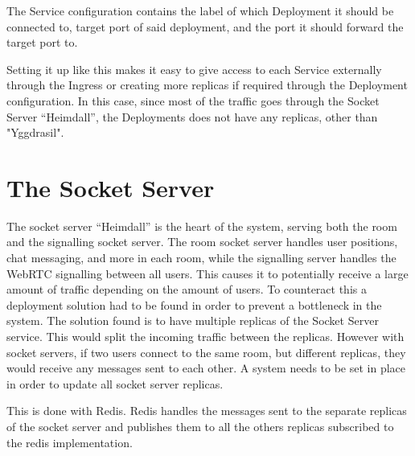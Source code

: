 The Service configuration contains the label of which Deployment it should be connected to, target port of said deployment, and the port it should forward the target port to. 

Setting it up like this makes it easy to give access to each Service externally through the Ingress or creating more replicas if required through the Deployment configuration. In this case, since most of the traffic goes through the Socket Server “Heimdall”, the Deployments does not have any replicas, other than "Yggdrasil".

\section{The Socket Server}

The socket server “Heimdall” is the heart of the system, serving both the room and the signalling socket server. The room socket server handles user positions, chat messaging, and more in each room, while the signalling server handles the WebRTC signalling between all users. This causes it to potentially receive a large amount of traffic depending on the amount of users. To counteract this a deployment solution had to be found in order to prevent a bottleneck in the system. The solution found is to have multiple replicas of the Socket Server service. This would split the incoming traffic between the replicas. However with socket servers, if two users connect to the same room, but different replicas, they would receive any messages sent to each other. A system needs to be set in place in order to update all socket server replicas. 

This is done with Redis. Redis handles the messages sent to the separate replicas of the socket server and publishes them to all the others replicas subscribed to the redis implementation. 

